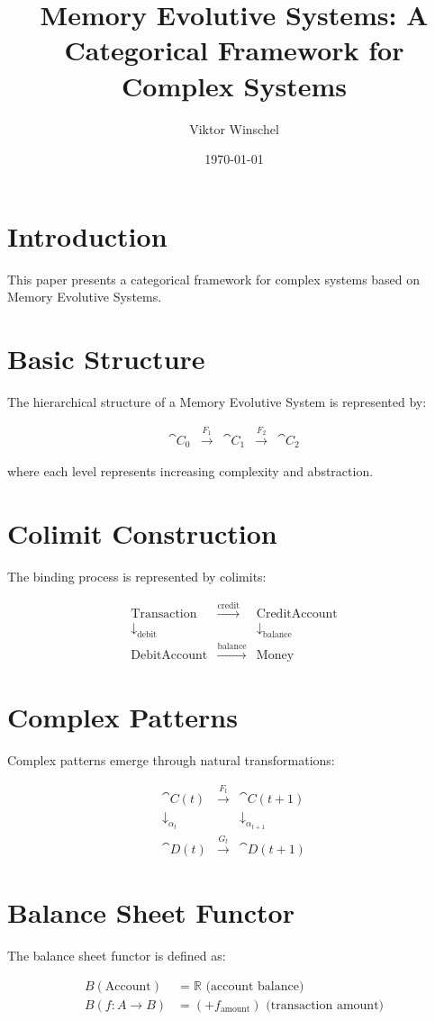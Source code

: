 \documentclass{article}
\title{Memory Evolutive Systems: A Categorical Framework for Complex Systems}
\author{Viktor Winschel}
\date{\today}
\begin{document}
\maketitle

\section{Introduction}

This paper presents a categorical framework for complex systems based on Memory Evolutive Systems.

\section{Basic Structure}

The hierarchical structure of a Memory Evolutive System is represented by:

\[
\begin{array}{ccccc}
\cat{C}_0 & \xrightarrow{F_1} & \cat{C}_1 & \xrightarrow{F_2} & \cat{C}_2
\end{array}
\]

where each level represents increasing complexity and abstraction.

\section{Colimit Construction}

The binding process is represented by colimits:

\[
\begin{array}{ccc}
\text{Transaction} & \xrightarrow{\text{credit}} & \text{CreditAccount} \\
\downarrow_{\text{debit}} & & \downarrow_{\text{balance}} \\
\text{DebitAccount} & \xrightarrow{\text{balance}} & \text{Money}
\end{array}
\]

\section{Complex Patterns}

Complex patterns emerge through natural transformations:

\[
\begin{array}{ccc}
\cat{C}(t) & \xrightarrow{F_t} & \cat{C}(t+1) \\
\downarrow_{\alpha_t} & & \downarrow_{\alpha_{t+1}} \\
\cat{D}(t) & \xrightarrow{G_t} & \cat{D}(t+1)
\end{array}
\]

\section{Balance Sheet Functor}

The balance sheet functor is defined as:

\[
\begin{array}{l}
B(\text{Account}) &= \mathbb{R} \text{ (account balance)} \\
B(f: A \to B) &= (+f_{\text{amount}}) \text{ (transaction amount)}
\end{array}
\]
\end{document}
